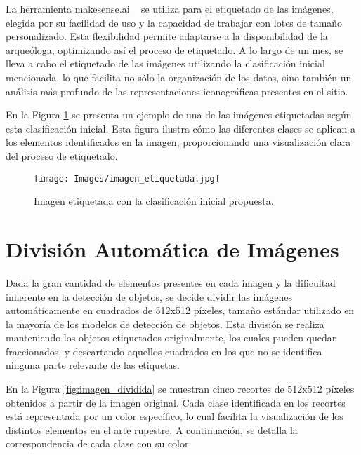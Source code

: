 La herramienta makesense.ai ~\cite{makesense} se utiliza para el etiquetado de las imágenes, elegida por su facilidad de uso y la capacidad de trabajar con lotes de tamaño personalizado. Esta flexibilidad permite adaptarse a la disponibilidad de la arqueóloga, optimizando así el proceso de etiquetado. A lo largo de un mes, se lleva a cabo el etiquetado de las imágenes utilizando la clasificación inicial mencionada, lo que facilita no sólo la organización de los datos, sino también un análisis más profundo de las representaciones iconográficas presentes en el sitio.

En la Figura \ref{fig:imagen_etiquetada} se presenta un ejemplo de una de las imágenes etiquetadas según esta clasificación inicial. Esta figura ilustra cómo las diferentes clases se aplican a los elementos identificados en la imagen, proporcionando una visualización clara del proceso de etiquetado.

\begin{figure}[ht!]
    \centering
    \texttt{[image: Images/imagen\_etiquetada.jpg]}
    \caption{Imagen etiquetada con la clasificación inicial propuesta.}
    \label{fig:imagen_etiquetada}
\end{figure}

\section{División Automática de Imágenes}
Dada la gran cantidad de elementos presentes en cada imagen y la dificultad inherente en la detección de objetos, se decide dividir las imágenes automáticamente en cuadrados de 512x512 píxeles, tamaño estándar utilizado en la mayoría de los modelos de detección de objetos. Esta división se realiza manteniendo los objetos etiquetados originalmente, los cuales pueden quedar fraccionados, y descartando aquellos cuadrados en los que no se identifica ninguna parte relevante de las etiquetas.

En la Figura \ref{fig:imagen_dividida} se muestran cinco recortes de 512x512 píxeles obtenidos a partir de la imagen original. Cada clase identificada en los recortes está representada por un color específico, lo cual facilita la visualización de los distintos elementos en el arte rupestre. A continuación, se detalla la correspondencia de cada clase con su color:

